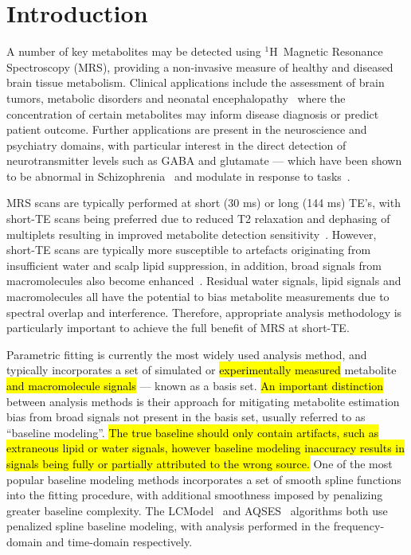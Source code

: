 \documentclass[num-refs]{wiley-article}
\newcommand{\proton}{\ensuremath{^1\mathrm{H}}}
\newcommand{\revone}[2]{\hl{#1}\marginnote{\hl{#2}}}
\begin{document}
\section{Introduction}
A number of key metabolites may be detected using \proton\ Magnetic Resonance Spectroscopy (MRS), providing a non-invasive measure of healthy and diseased brain tissue metabolism. Clinical applications include the assessment of brain tumors, metabolic disorders and neonatal encephalopathy~\cite{Oz2014,Lally2019} where the concentration of certain metabolites may inform disease diagnosis or predict patient outcome. Further applications are present in the neuroscience and psychiatry domains, with particular interest in the direct detection of neurotransmitter levels such as GABA and glutamate --- which have been shown to be abnormal in Schizophrenia~\cite{Merritt2016} and modulate in response to tasks~\cite{Jelen2018,Chen2017}.

MRS scans are typically performed at short (30 ms) or long (144 ms) TE's, with short-TE scans being preferred due to reduced T2 relaxation and dephasing of multiplets resulting in improved metabolite detection sensitivity~\cite{Wilson2019}. However, short-TE scans are typically more susceptible to artefacts originating from insufficient water and scalp lipid suppression, in addition, broad signals from macromolecules also become enhanced~\cite{Cudalbu2012}. Residual water signals, lipid signals and macromolecules all have the potential to bias metabolite measurements due to spectral overlap and interference. Therefore, appropriate analysis methodology is particularly important to achieve the full benefit of MRS at short-TE.

Parametric fitting is currently the most widely used analysis method, and typically incorporates a set of simulated or \revone{experimentally measured}{R2.2} metabolite \revone{and macromolecule signals}{R2.1} --- known as a basis set. \revone{An important distinction}{R0.1} between analysis methods is their approach for mitigating metabolite estimation bias from broad signals not present in the basis set, usually referred to as ``baseline modeling''. \revone{The true baseline should only contain artifacts, such as extraneous lipid or water signals, however baseline modeling inaccuracy results in signals being fully or partially attributed to the wrong source.}{R2.1} One of the most popular baseline modeling methods incorporates a set of smooth spline functions into the fitting procedure, with additional smoothness imposed by penalizing greater baseline complexity. The LCModel~\cite{Provencher1993} and AQSES~\cite{Poullet2007} algorithms both use penalized spline baseline modeling, with analysis performed in the frequency-domain and time-domain respectively.
\end{document}
